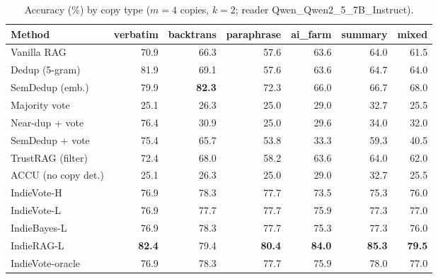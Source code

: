 \begin{table}[tbp]
\centering
\small
\caption{Accuracy (\%) by copy type ($m{=}4$ copies, $k{=}2$; reader Qwen\_Qwen2\_5\_7B\_Instruct).}
\label{tab:types}
\setlength{\tabcolsep}{4pt}
\begin{tabular}{lrrrrrr}
\toprule
Method & verbatim & backtrans & paraphrase & ai\_farm & summary & mixed \\
\midrule
Vanilla RAG & 70.9 & 66.3 & 57.6 & 63.6 & 64.0 & 61.5 \\
Dedup (5-gram) & 81.9 & 69.1 & 57.6 & 63.6 & 64.7 & 64.0 \\
SemDedup (emb.) & 79.9 & \textbf{82.3} & 72.3 & 66.0 & 66.7 & 68.0 \\
Majority vote & 25.1 & 26.3 & 25.0 & 29.0 & 32.7 & 25.5 \\
Near-dup + vote & 76.4 & 30.9 & 25.0 & 29.6 & 34.0 & 32.0 \\
SemDedup + vote & 75.4 & 65.7 & 53.8 & 33.3 & 59.3 & 40.5 \\
TrustRAG (filter) & 72.4 & 68.0 & 58.2 & 63.6 & 64.0 & 62.0 \\
ACCU (no copy det.) & 25.1 & 26.3 & 25.0 & 29.0 & 32.7 & 25.5 \\
IndieVote-H & 76.9 & 78.3 & 77.7 & 73.5 & 75.3 & 76.0 \\
IndieVote-L & 76.9 & 77.7 & 77.7 & 75.9 & 77.3 & 77.0 \\
IndieBayes-L & 76.9 & 78.3 & 77.7 & 75.3 & 77.3 & 76.0 \\
IndieRAG-L & \textbf{82.4} & 79.4 & \textbf{80.4} & \textbf{84.0} & \textbf{85.3} & \textbf{79.5} \\
IndieVote-oracle & 76.9 & 78.3 & 77.7 & 75.9 & 78.0 & 77.0 \\
\bottomrule
\end{tabular}
\end{table}
